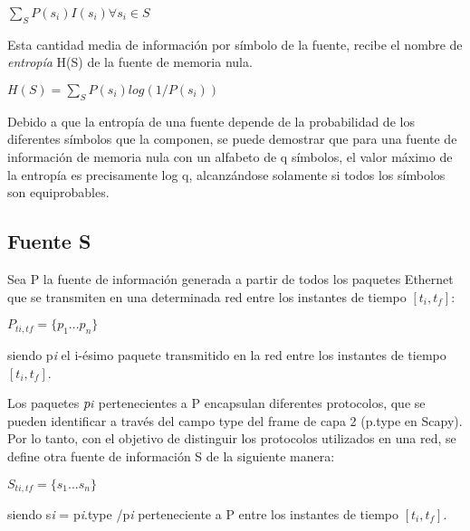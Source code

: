 \documentclass[final,inline,narroweqnarray,a4paper]{ieee}
\begin{document}
\begin{center}
$\sum_{S} P(s_{i})I(s_{i}) \forall{s_{i}} \in{S}$
\end{center}

\begin{flushleft}
	Esta cantidad media de información por símbolo de la fuente, recibe el nombre de \textit{entropía} H(S) de la fuente de memoria nula.
\end{flushleft}

\begin{center}
	$H(S) =\sum_{S} P(s_{i})log(1/P(s_{i}))$ 

\end{center}
	
Debido a que la entropía de una fuente depende de la probabilidad de los diferentes símbolos que la componen, se puede demostrar que para una fuente de información de memoria nula con un alfabeto de q símbolos, el valor máximo de la entropía es precisamente log q, alcanzándose solamente si todos los símbolos son equiprobables.


\subsection{Fuente S}

Sea P la fuente de información generada a partir de todos los paquetes Ethernet que se transmiten en una determinada red entre los instantes de tiempo $[t_{i}, t_{f}]$:

	$P_{ti,tf} = \{p_{1}...p_{n}\}$ 

\begin{flushleft}
	siendo p{\scriptsize \textit{i}} el i-ésimo paquete transmitido en la red entre los instantes de tiempo $[t_{i},t_{f}]$.
\end{flushleft}

Los paquetes $p{\scriptsize \textit{i}}$ pertenecientes a P encapsulan diferentes protocolos, que se pueden identificar a través del campo type del frame de capa 2 (p.type en Scapy). Por lo tanto, con el objetivo de distinguir los protocolos utilizados en una red, se define otra fuente de información S de la siguiente manera:

$S_{ti,tf} = \{s_{1}...s_{n}\}$ 

\begin{flushleft}
	siendo s{\scriptsize \textit{i}} = p{\scriptsize \textit{i}}.type /p{\scriptsize \textit{i}} perteneciente a P entre los instantes de tiempo $[t_{i},t_{f}]$.
\end{flushleft}
\end{document}
